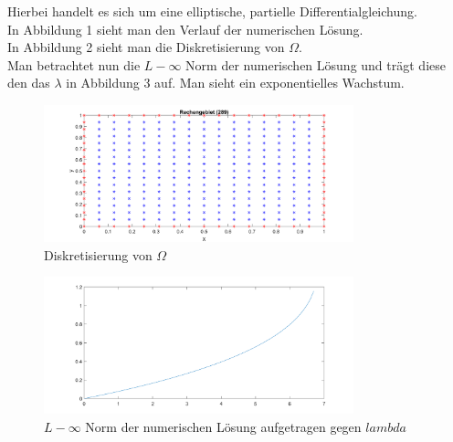 \documentclass[11pt,a4paper]{article}
\begin{document}
Hierbei handelt es sich um eine elliptische, partielle Differentialgleichung.\\
  
In Abbildung 1 sieht man den Verlauf der numerischen L\"osung.\\

In Abbildung 2 sieht man die Diskretisierung von $\Omega$.\\

Man betrachtet nun die $L-\infty$ Norm der numerischen L\"osung und trägt diese den das $\lambda$ in Abbildung 3 auf. Man sieht ein exponentielles Wachstum.

\begin{figure}
\includegraphics[width=0.8\textwidth]{bild1}
\caption{Diskretisierung von $\Omega$}
\end{figure}  


\begin{figure}
\includegraphics[width=0.8\textwidth]{bild3}
\caption{$L-\infty$ Norm der numerischen L\"osung aufgetragen gegen $lambda$}
\end{figure}  
\end{document}
